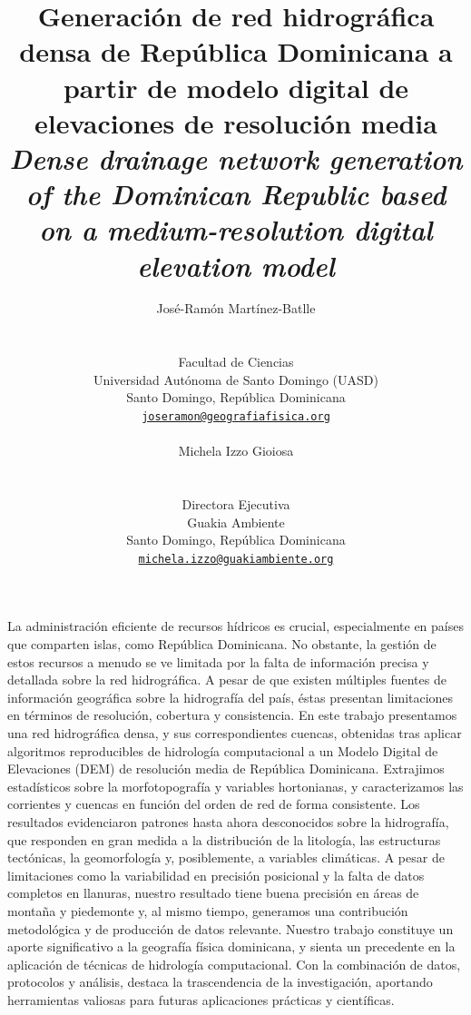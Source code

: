 \documentclass[spanish]{article}
\title{Generación de red hidrográfica densa de República Dominicana a
partir de modelo digital de elevaciones de resolución media
\newline \textit{\large Dense drainage network generation of the Dominican Republic based on a medium-resolution digital elevation model}}
\author{
    \parbox[t]{10cm}{\centering José-Ramón Martínez-Batlle \\ \orcidlink{0000-0001-9924-0327}}
   \\
    Facultad de Ciencias \\
    Universidad Autónoma de Santo Domingo (UASD) \\
  Santo Domingo, República Dominicana \\
  \texttt{\href{mailto:joseramon@geografiafisica.org}{\nolinkurl{joseramon@geografiafisica.org}}} \\
   \And
    \parbox[t]{10cm}{\centering Michela Izzo Gioiosa \\ \orcidlink{0000-0003-4835-3967}}
   \\
    Directora Ejecutiva \\
    Guakia Ambiente \\
  Santo Domingo, República Dominicana \\
  \texttt{\href{mailto:michela.izzo@guakiambiente.org}{\nolinkurl{michela.izzo@guakiambiente.org}}} \\
  }
\begin{document}
\maketitle


\begin{resumen}
La administración eficiente de recursos hídricos es crucial,
especialmente en países que comparten islas, como República Dominicana.
No obstante, la gestión de estos recursos a menudo se ve limitada por la
falta de información precisa y detallada sobre la red hidrográfica. A
pesar de que existen múltiples fuentes de información geográfica sobre
la hidrografía del país, éstas presentan limitaciones en términos de
resolución, cobertura y consistencia. En este trabajo presentamos una
red hidrográfica densa, y sus correspondientes cuencas, obtenidas tras
aplicar algoritmos reproducibles de hidrología computacional a un Modelo
Digital de Elevaciones (DEM) de resolución media de República
Dominicana. Extrajimos estadísticos sobre la morfotopografía y variables
hortonianas, y caracterizamos las corrientes y cuencas en función del
orden de red de forma consistente. Los resultados evidenciaron patrones
hasta ahora desconocidos sobre la hidrografía, que responden en gran
medida a la distribución de la litología, las estructuras tectónicas, la
geomorfología y, posiblemente, a variables climáticas. A pesar de
limitaciones como la variabilidad en precisión posicional y la falta de
datos completos en llanuras, nuestro resultado tiene buena precisión en
áreas de montaña y piedemonte y, al mismo tiempo, generamos una
contribución metodológica y de producción de datos relevante. Nuestro
trabajo constituye un aporte significativo a la geografía física
dominicana, y sienta un precedente en la aplicación de técnicas de
hidrología computacional. Con la combinación de datos, protocolos y
análisis, destaca la trascendencia de la investigación, aportando
herramientas valiosas para futuras aplicaciones prácticas y científicas.
\end{resumen}


\end{document}
